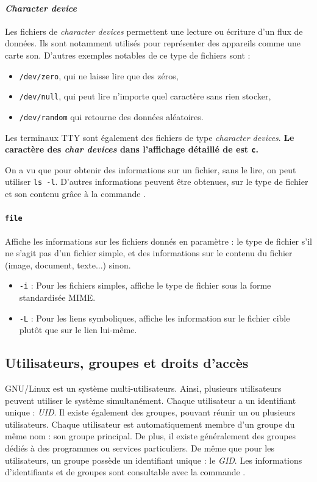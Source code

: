 \paragraph{\textit{Character device}} \label{sec:file_char}
Les fichiers de \textit{character devices} permettent une lecture ou écriture d'un flux de données. Ils sont notamment utilisés pour représenter des appareils comme une carte son. D'autres exemples notables de ce type de fichiers sont :
\begin{itemize}
    \item \texttt{/dev/zero}, qui ne laisse lire que des zéros,
    \item \texttt{/dev/null}, qui peut lire n'importe quel caractère sans rien stocker,
    \item \texttt{/dev/random} qui retourne des données aléatoires.
\end{itemize}
Les terminaux TTY sont également des fichiers de type \textit{character devices}. \newline
\textbf{Le caractère des \textit{char devices} dans l'affichage détaillé de  est \texttt{c}.}

On a vu que pour obtenir des informations sur un fichier, sans le lire, on peut utiliser \texttt{ls -l}. D'autres informations peuvent être obtenues, sur le type de fichier et son contenu grâce à la commande .

\paragraph{\texttt{file}} 
Affiche les informations sur les fichiers donnés en paramètre : le type de fichier s'il ne s'agit pas d'un fichier simple, et des informations sur le contenu du fichier (image, document, texte...) sinon.
\begin{itemize}
    \item \texttt{-i} : Pour les fichiers simples, affiche le type de fichier sous la forme standardisée MIME.
    \item \texttt{-L} : Pour les liens symboliques, affiche les information sur le fichier cible plutôt que sur le lien lui-même.
\end{itemize}

\newpage

\subsection{Utilisateurs, groupes et droits d'accès} \label{sec:users}
\vspace{-2mm}
GNU/Linux est un système multi-utilisateurs. Ainsi, plusieurs utilisateurs peuvent utiliser le système simultanément. Chaque utilisateur a un identifiant unique : \textit{UID}. Il existe également des groupes, pouvant réunir un ou plusieurs utilisateurs. Chaque utilisateur est automatiquement membre d'un groupe du même nom : son groupe principal. De plus, il existe généralement des groupes dédiés à des programmes ou services particuliers. De même que pour les utilisateurs, un groupe possède un identifiant unique : le \textit{GID}. Les informations d'identifiants et de groupes sont consultable avec la commande .

